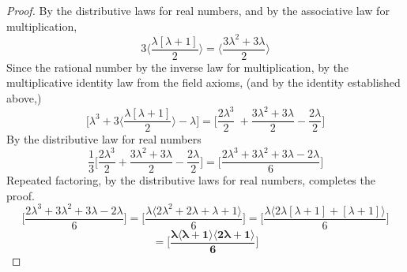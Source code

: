 \documentclass[preview]{standalone}
\begin{document}
\begin{proof}
    By the distributive laws for real numbers, 
    and by the associative law for multiplication,
    \begin{equation*}
        3 \bigg \langle \frac{ \lambda [ \lambda + 1 ] }{2} \bigg \rangle 
            = 
        \bigg \langle \frac{3 \lambda ^2 + 3 \lambda }{2} \bigg \rangle
    \end{equation*}
    Since the rational number  
    by the inverse law for multiplication, 
    by the multiplicative identity law from the field axioms,
    (and by the identity established above,)
    \begin{equation*} 
            \bigg[ 
                \lambda ^3 
                    + 
                3 \bigg \langle \frac{ \lambda [ \lambda + 1 ] }{2} \bigg \rangle
                    - 
                \lambda 
            \bigg]
            =
            \bigg[
                \frac{ 2 \lambda ^3 }{2} \
                    + 
                \frac{ 3 \lambda ^2 + 3 \lambda }{2} 
                    - 
                \frac{ 2 \lambda }{2}
            \bigg]
    \end{equation*}
    By the distributive law for real numbers
    \begin{equation*}
            \frac{1}{3}
            \bigg[
                \frac{ 2 \lambda ^3 }{2} 
                    + 
                \frac{ 3 \lambda ^2 + 3 \lambda }{2} 
                    - 
                \frac{ 2 \lambda }{2}
            \bigg]
                =
            \bigg[
                \frac{ 2 \lambda ^3 + 3 \lambda ^2 + 3 \lambda - 2 \lambda }
                {6}
            \bigg]
    \end{equation*}
    Repeated factoring, 
    by the distributive laws for real numbers,
    completes the proof.
    \begin{equation*}
        \bigg[
            \frac{ 2 \lambda ^3 + 3 \lambda ^2 + 3 \lambda - 2 \lambda }{6}
        \bigg]
            =
        \bigg[
            \frac{ \lambda \langle 2 \lambda ^2 + 2 \lambda + \lambda + 1 \rangle }{6}
        \bigg]
            =
        \bigg[
            \frac{ \lambda \langle 2 \lambda [\lambda + 1] + [\lambda + 1] \rangle }{6}
        \bigg]
    \end{equation*}
    \begin{equation*}
            =
        \bm{
            \bigg[
                \frac{ \lambda \langle \lambda + 1 \rangle \langle 2 \lambda + 1 \rangle }{6}
            \bigg]
        }
    \end{equation*}
\end{proof}
\end{document}
